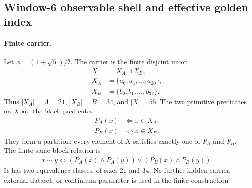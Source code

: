 
\subsection{Window-6 observable shell and effective golden index}
\label{sec:window6-observable-shell-effective-golden-index-flow}

\paragraph{Finite carrier.}
Let $\phi=(1+\sqrt{5})/2$. The carrier is the finite disjoint union
$$
\begin{aligned}
X&=X_A\sqcup X_B,\\
X_A&=\{a_0,a_1,\ldots,a_{20}\},\\
X_B&=\{b_0,b_1,\ldots,b_{33}\}.
\end{aligned}
$$
Thus $|X_A|=A=21$, $|X_B|=B=34$, and $|X|=55$. The two primitive predicates on $X$ are the block predicates
$$
\begin{aligned}
P_A(x)&\Longleftrightarrow x\in X_A,\\
P_B(x)&\Longleftrightarrow x\in X_B.
\end{aligned}
$$
They form a partition: every element of $X$ satisfies exactly one of $P_A$ and $P_B$. The finite same-block relation is
$$
\begin{aligned}
x\sim y\Longleftrightarrow (P_A(x)\wedge P_A(y))\vee(P_B(x)\wedge P_B(y)).
\end{aligned}
$$
It has two equivalence classes, of sizes $21$ and $34$. No further hidden carrier, external dataset, or continuum parameter is used in the finite construction.

